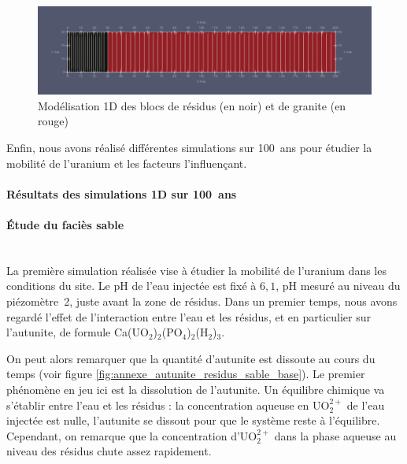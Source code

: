 \documentclass{article}
\begin{document}
\begin{figure}[H]
    \centering
    \includegraphics[width=0.9\linewidth]{III_B_2_1.png}
    \caption{Modélisation 1D des blocs de résidus (en noir) et de granite (en rouge)}
    \label{fig:modele_bloc}
\end{figure}

Enfin, nous avons réalisé différentes simulations sur 100~ans pour étudier la mobilité de l’uranium et les facteurs l’influençant.


\paragraph{Résultats des simulations 1D sur 100~ans}


\paragraph{Étude du faciès sable \\ \\}
La première simulation réalisée vise à étudier la mobilité de l’uranium dans les conditions du site. Le pH de l’eau injectée est fixé à $6,1$, pH mesuré au niveau du piézomètre~2, juste avant la zone de résidus. Dans un premier temps, nous avons regardé l’effet de l'interaction entre l’eau et les résidus, et en particulier sur l’autunite, de formule Ca(UO$_2$)$_2$(PO$_4$)$_2$(H$_2$)$_3$.

On peut alors remarquer que la quantité d’autunite est dissoute au cours du temps (voir figure \ref{fig:annexe_autunite_residus_sable_base}). Le premier phénomène en jeu ici est la dissolution de l’autunite. Un équilibre chimique va s’établir entre l’eau et les résidus : la concentration aqueuse en UO$_2^{2+}$ de l’eau injectée est nulle, l’autunite se dissout pour que le système reste à l’équilibre. Cependant, on remarque que la concentration d'UO$_2^{2+}$ dans la phase aqueuse au niveau des résidus chute assez rapidement.
\end{document}
